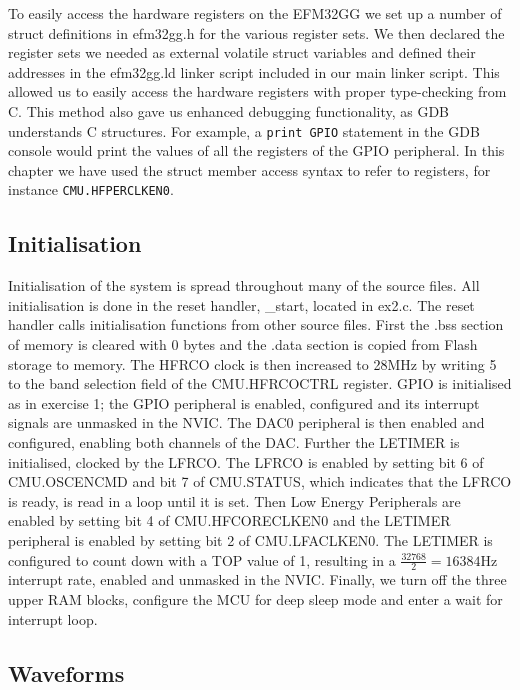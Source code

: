 To easily access the hardware registers on the EFM32GG we set up a number of
struct definitions in efm32gg.h for the various register sets. We then declared
the register sets we needed as external volatile struct variables and defined
their addresses in the efm32gg.ld linker script included in our main linker
script. This allowed us to easily access the hardware registers with proper
type-checking from C. This method also gave us enhanced debugging functionality,
as GDB understands C structures. For example, a \texttt{print GPIO} statement in
the GDB console would print the values of all the registers of the GPIO
peripheral. In this chapter we have used the struct member access syntax to
refer to registers, for instance \texttt{CMU.HFPERCLKEN0}.

\subsection{Initialisation}

Initialisation of the system is spread throughout many of the source files. All
initialisation is done in the reset handler, \_start, located in ex2.c. The
reset handler calls initialisation functions from other source files. First the
.bss section of memory is cleared with 0 bytes and the .data section is copied
from Flash storage to memory. The HFRCO clock is then increased to 28MHz by
writing 5 to the band selection field of the CMU.HFRCOCTRL register. GPIO is
initialised as in exercise 1; the GPIO peripheral is enabled, configured and its
interrupt signals are unmasked in the NVIC. The DAC0 peripheral is then enabled
and configured, enabling both channels of the DAC. Further the LETIMER is
initialised, clocked by the LFRCO. The LFRCO is enabled by setting bit 6 of
CMU.OSCENCMD and bit 7 of CMU.STATUS, which indicates that the LFRCO is ready,
is read in a loop until it is set. Then Low Energy Peripherals are enabled by
setting bit 4 of CMU.HFCORECLKEN0 and the LETIMER peripheral is enabled by
setting bit 2 of CMU.LFACLKEN0. The LETIMER is configured to count down with a
TOP value of 1, resulting in a \(\frac{32768}{2} = 16384\)Hz interrupt rate,
enabled and unmasked in the NVIC. Finally, we turn off the three upper RAM
blocks, configure the MCU for deep sleep mode and enter a wait for interrupt
loop.

\subsection{Waveforms}

